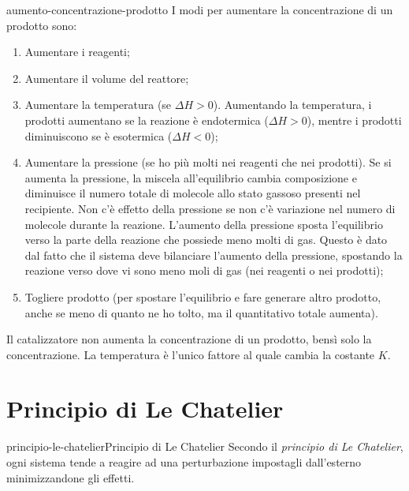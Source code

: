 \documentclass[preview]{standalone}
\begin{document}
\begin{snippet}{aumento-concentrazione-prodotto}
    I modi per aumentare la concentrazione di un prodotto sono:
    \begin{enumerate}
        \item Aumentare i reagenti;
        \item Aumentare il volume del reattore;
        \item Aumentare la temperatura (se \(\Delta H > 0\)).
            Aumentando la temperatura,
            i prodotti aumentano se la reazione è endotermica (\(\Delta H > 0\)),
            mentre i prodotti diminuiscono se è esotermica (\(\Delta H < 0\));
        \item Aumentare la pressione (se ho più molti nei reagenti che nei prodotti).
            Se si aumenta la pressione, la miscela all'equilibrio
            cambia composizione e diminuisce il numero totale di molecole allo stato gassoso presenti nel recipiente.
            Non c'è effetto della pressione
            se non c'è variazione nel numero di molecole durante la reazione.
            L'aumento della pressione sposta l'equilibrio verso la parte della reazione che possiede meno molti di gas.
            Questo è dato dal fatto che il sistema deve bilanciare l'aumento della pressione, spostando
            la reazione verso dove vi sono meno moli di gas (nei reagenti o nei prodotti);
        \item Togliere prodotto (per spostare l'equilibrio e fare generare altro prodotto, anche se meno di quanto ne ho tolto,
            ma il quantitativo totale aumenta).
    \end{enumerate}

    Il catalizzatore non aumenta la concentrazione di un prodotto, bensì solo la concentrazione.
    La temperatura è l'unico fattore al quale cambia la costante \(K\).
\end{snippet}

\section{Principio di Le Chatelier}

\begin{snippetdefinition}{principio-le-chatelier}{Principio di Le Chatelier}
    Secondo il \textit{principio di Le Chatelier},
    ogni sistema tende a reagire ad una perturbazione impostagli
    dall'esterno minimizzandone gli effetti.
\end{snippetdefinition}
\end{document}
